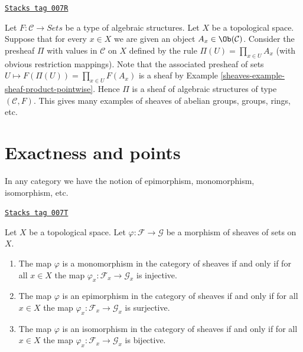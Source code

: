 \begin{example}
\label{sheaves-example-sheaf-product-pointwise-algebraic-structure}
\href{https://stacks.math.columbia.edu/tag/007R}{\texttt{Stacks tag 007R}}

Let $F : \mathcal{C} \to \textit{Sets}$ be a
type of algebraic structures.
Let $X$ be a topological space. Suppose that
for every $x \in X$ we are given an object
$A_x \in \Ob(\mathcal{C})$. Consider the presheaf
$\Pi$ with values in $\mathcal{C}$ on $X$ defined by the rule
$\Pi(U) = \prod_{x \in U} A_x$ (with obvious restriction
mappings). Note that the associated presheaf of sets
$U \mapsto F(\Pi(U)) = \prod_{x \in U} F(A_x)$ is a sheaf
by Example \ref{sheaves-example-sheaf-product-pointwise}.
Hence $\Pi$ is a sheaf of algebraic structures
of type $(\mathcal{C} , F)$. This gives many examples
of sheaves of abelian groups, groups, rings, etc.
\end{example}

\section{Exactness and points}
\label{sheaves-section-exactness-points}
In any category we have the notion of epimorphism, monomorphism,
isomorphism, etc.

\begin{lemma}
\label{sheaves-lemma-points-exactness}
\href{https://stacks.math.columbia.edu/tag/007T}{\texttt{Stacks tag 007T}}

Let $X$ be a topological space. Let $\varphi : \mathcal{F} \to \mathcal{G}$
be a morphism of sheaves of sets on $X$.
\begin{enumerate}
\item The map $\varphi$ is a monomorphism in the category of sheaves
if and only if for all $x \in X$ the map
$\varphi_x : \mathcal{F}_x \to \mathcal{G}_x$
is injective.
\item The map $\varphi$ is an epimorphism in the category of sheaves
if and only if for all $x \in X$ the map
$\varphi_x : \mathcal{F}_x \to \mathcal{G}_x$
is surjective.
\item The map $\varphi$ is an isomorphism in the category of sheaves
if and only if for all $x \in X$ the map
$\varphi_x : \mathcal{F}_x \to \mathcal{G}_x$
is bijective.
\end{enumerate}
\end{lemma}

